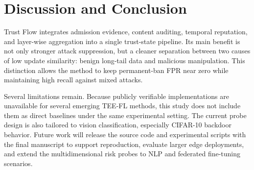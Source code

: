 \documentclass[runningheads,orivec]{llncs}
\begin{document}
\section{Discussion and Conclusion}

Trust Flow integrates admission evidence, content auditing, temporal reputation, and layer-wise aggregation into a single trust-state pipeline. Its main benefit is not only stronger attack suppression, but a cleaner separation between two causes of low update similarity: benign long-tail data and malicious manipulation. This distinction allows the method to keep permanent-ban FPR near zero while maintaining high recall against mixed attacks.

Several limitations remain. Because publicly verifiable implementations are unavailable for several emerging TEE-FL methods, this study does not include them as direct baselines under the same experimental setting. The current probe design is also tailored to vision classification, especially CIFAR-10 backdoor behavior. Future work will release the source code and experimental scripts with the final manuscript to support reproduction, evaluate larger edge deployments, and extend the multidimensional risk probes to NLP and federated fine-tuning scenarios.
\end{document}
